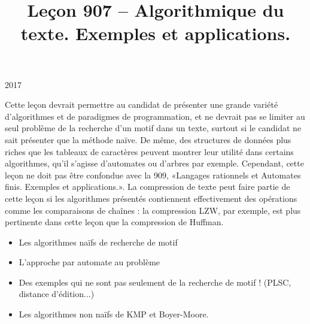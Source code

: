 \documentclass{article}
\title{Leçon 907 -- Algorithmique du texte. Exemples et applications.}
\begin{document}
\maketitle

\secrapports

\begin{rapport}{2017}

    Cette leçon devrait permettre au candidat de présenter une grande variété d’algorithmes et de paradigmes de programmation, et ne devrait pas se limiter au seul problème de la recherche d’un motif dans un texte, surtout si le candidat ne sait présenter que la méthode naïve. De même, des structures de données plus riches que les tableaux de caractères peuvent montrer leur utilité dans certains algorithmes, qu’il s’agisse d’automates ou d’arbres par exemple. Cependant, cette leçon ne doit pas être confondue avec la 909, «Langages rationnels et Automates finis. Exemples et applications.». La compression de texte peut faire partie de cette leçon si les algorithmes présentés contiennent effectivement des opérations comme les comparaisons de chaînes : la compression LZW, par exemple, est plus pertinente dans cette leçon que la compression de Huffman.

\end{rapport}

\secindispensables

\begin{itemize}
    \item Les algorithmes naïfs de recherche de motif
    \item L'approche par automate au problème
    \item Des exemples qui ne sont pas seulement de la recherche 
        de motif ! (PLSC, distance d'édition...)
    \item Les algorithmes non naïfs de KMP et Boyer-Moore.
\end{itemize}

\secpieges
\end{document}
